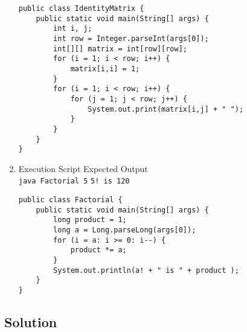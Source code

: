 \begin{enumerate}[label=\textbf{(\alph*)}]
\begin{lstlisting}
public class IdentityMatrix {
	public static void main(String[] args) {
		int i, j;
		int row = Integer.parseInt(args[0]);
		int[][] matrix = int[row][row];
		for (i = 1; i < row; i++) {
			matrix[i,i] = 1;
		}
		for (i = 1; i < row; i++) {
			for (j = 1; j < row; j++) {
				System.out.print(matrix[i,j] + " ");
			}
		}
	}
}
\end{lstlisting}

\item Execution Script \hfill Expected Output\\
\texttt{java Factorial 5} \hfill \texttt{5! is 120}

\begin{lstlisting}
public class Factorial {
	public static void main(String[] args) {
		long product = 1;
		long a = Long.parseLong(args[0]);
		for (i = a: i >= 0: i--) {
			product *= a;
		}
		System.out.println(a! + " is " + product );
	}
}
\end{lstlisting}

\end{enumerate}

\subsection*{Solution}

